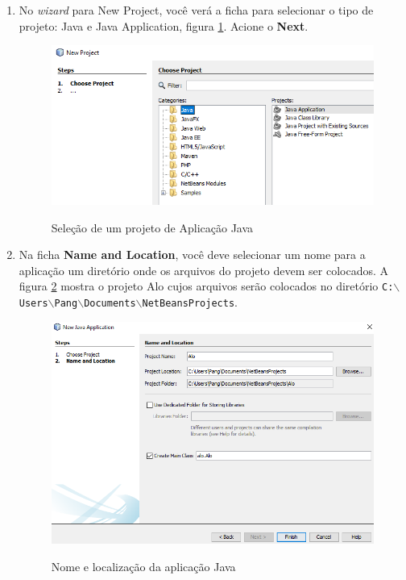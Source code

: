 \documentclass[
	12pt,				%
	twoside,			%
	a4paper,			%
	english,			%
	french,				%
	spanish,			%
	brazil				%
	]{abntex2}
\begin{document}
\begin{enumerate}
\item No \emph{wizard} para New Project, você verá a ficha para selecionar o tipo de projeto: Java e Java Application, figura \ref{fig:typeProj}. Acione o \textbf{Next}.
\begin{figure}[h]
\begin{center}
\includegraphics[scale=0.35]{newProj.png} 
\caption{Seleção de um projeto de Aplicação Java}
\label{fig:typeProj}
\end{center}
\end{figure}
\item Na ficha \textbf{Name and Location}, você deve selecionar um nome para a aplicação um diretório onde os arquivos do projeto devem ser colocados. A figura \ref{fig:nameProj} mostra o projeto Alo cujos arquivos serão colocados no diretório \texttt{C:$\backslash$Users$\backslash$Pang$\backslash$Documents$\backslash$NetBeansProjects}.
\begin{figure}[h]
\begin{center}
\includegraphics[scale=0.3]{proj-step2.png} 
\caption{Nome e localização da aplicação Java}
\label{fig:nameProj}
\end{center}
\end{figure}


\end{enumerate}
\end{document}
